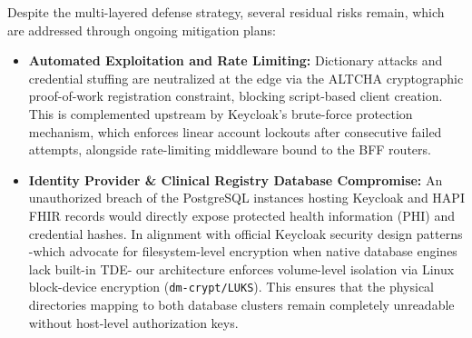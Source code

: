 Despite the multi-layered defense strategy, several residual risks remain, which are addressed through ongoing mitigation plans:

\begin{itemize}
    \item \textbf{Automated Exploitation and Rate Limiting:} Dictionary attacks and credential stuffing are neutralized at the edge via the ALTCHA cryptographic proof-of-work registration constraint, blocking script-based client creation. 
    This is complemented upstream by Keycloak's brute-force protection mechanism, which enforces linear account lockouts after consecutive failed attempts, alongside rate-limiting middleware bound to the BFF routers.
    \item \textbf{Identity Provider \& Clinical Registry Database Compromise:} An unauthorized breach of the PostgreSQL instances hosting Keycloak and HAPI FHIR records would directly expose protected health information (PHI) and credential hashes. 
    In alignment with official Keycloak security design patterns -which advocate for filesystem-level encryption when native database engines lack built-in \ac{TDE}- our architecture enforces volume-level isolation via Linux block-device encryption (\texttt{dm-crypt/LUKS}). 
    This ensures that the physical directories mapping to both database clusters remain completely unreadable without host-level authorization keys.

\end{itemize}
